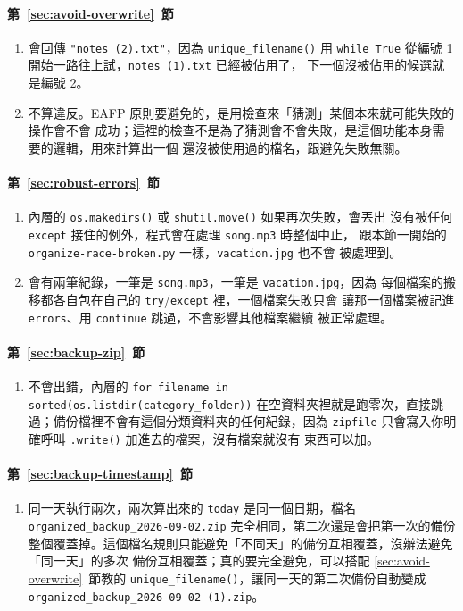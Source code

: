 \paragraph{第~\ref{sec:avoid-overwrite}~節}
\begin{enumerate}
\item 會回傳 \texttt{"notes (2).txt"}，因為 \texttt{unique\_filename()} 用
\texttt{while True} 從編號 1 開始一路往上試，\texttt{notes (1).txt} 已經被佔用了，
下一個沒被佔用的候選就是編號 2。
\item 不算違反。EAFP 原則要避免的，是用檢查來「猜測」某個本來就可能失敗的操作會不會
成功；這裡的檢查不是為了猜測會不會失敗，是這個功能本身需要的邏輯，用來計算出一個
還沒被使用過的檔名，跟避免失敗無關。
\end{enumerate}

\paragraph{第~\ref{sec:robust-errors}~節}
\begin{enumerate}
\item 內層的 \texttt{os.makedirs()} 或 \texttt{shutil.move()} 如果再次失敗，會丟出
沒有被任何 \texttt{except} 接住的例外，程式會在處理 \texttt{song.mp3} 時整個中止，
跟本節一開始的 \texttt{organize-race-broken.py} 一樣，\texttt{vacation.jpg} 也不會
被處理到。
\item 會有兩筆紀錄，一筆是 \texttt{song.mp3}，一筆是 \texttt{vacation.jpg}，因為
每個檔案的搬移都各自包在自己的 \texttt{try}/\texttt{except} 裡，一個檔案失敗只會
讓那一個檔案被記進 \texttt{errors}、用 \texttt{continue} 跳過，不會影響其他檔案繼續
被正常處理。
\end{enumerate}

\paragraph{第~\ref{sec:backup-zip}~節}
\begin{enumerate}
\item 不會出錯，內層的 \texttt{for filename in sorted(os.listdir(category\_folder))}
在空資料夾裡就是跑零次，直接跳過；備份檔裡不會有這個分類資料夾的任何紀錄，因為
\texttt{zipfile} 只會寫入你明確呼叫 \texttt{.write()} 加進去的檔案，沒有檔案就沒有
東西可以加。
\end{enumerate}

\paragraph{第~\ref{sec:backup-timestamp}~節}
\begin{enumerate}
\item 同一天執行兩次，兩次算出來的 \texttt{today} 是同一個日期，檔名
\texttt{organized\_backup\_2026-09-02.zip} 完全相同，第二次還是會把第一次的備份
整個覆蓋掉。這個檔名規則只能避免「不同天」的備份互相覆蓋，沒辦法避免「同一天」的多次
備份互相覆蓋；真的要完全避免，可以搭配 \ref{sec:avoid-overwrite}~節教的
\texttt{unique\_filename()}，讓同一天的第二次備份自動變成
\texttt{organized\_backup\_2026-09-02 (1).zip}。
\end{enumerate}

